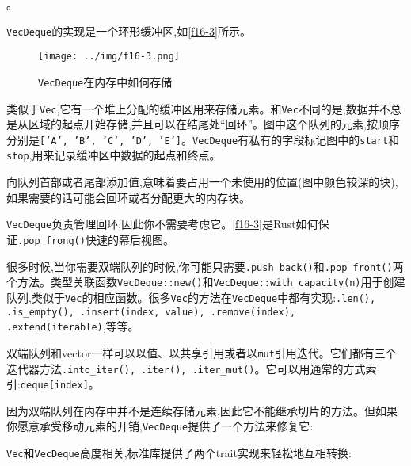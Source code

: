 。

\texttt{VecDeque}的实现是一个环形缓冲区,如\autoref{f16-3}所示。

\begin{figure}[htbp]
    \centering
    \texttt{[image: ../img/f16-3.png]}
    \caption{\texttt{VecDeque}在内存中如何存储}
    \label{f16-3}
\end{figure}

类似于\texttt{Vec},它有一个堆上分配的缓冲区用来存储元素。和\texttt{Vec}不同的是,数据并不总是从区域的起点开始存储,并且可以在结尾处“回环”。图中这个队列的元素,按顺序分别是\texttt{['A', 'B', 'C', 'D', 'E']}。\texttt{VecDeque}有私有的字段标记图中的\texttt{start}和\texttt{stop},用来记录缓冲区中数据的起点和终点。

向队列首部或者尾部添加值,意味着要占用一个未使用的位置(图中颜色较深的块),如果需要的话可能会回环或者分配更大的内存块。

\texttt{VecDeque}负责管理回环,因此你不需要考虑它。\autoref{f16-3}是Rust如何保证\texttt{.pop\_frong()}快速的幕后视图。

很多时候,当你需要双端队列的时候,你可能只需要\texttt{.push\_back()}和\texttt{.pop\_front()}两个方法。类型关联函数\texttt{VecDeque::new()}和\texttt{VecDeque::with\_capacity(n)}用于创建队列,类似于\texttt{Vec}的相应函数。很多\texttt{Vec}的方法在\texttt{VecDeque}中都有实现:\texttt{.len(), .is\_empty(), .insert(index, value), .remove(index), \\
.extend(iterable)},等等。

双端队列和vector一样可以以值、以共享引用或者以\texttt{mut}引用迭代。它们都有三个迭代器方法\texttt{.into\_iter(), .iter(), .iter\_mut()}。它可以用通常的方式索引:\texttt{deque[index]}。

因为双端队列在内存中并不是连续存储元素,因此它不能继承切片的方法。但如果你愿意承受移动元素的开销,\texttt{VecDeque}提供了一个方法来修复它:


\texttt{Vec}和\texttt{VecDeque}高度相关,标准库提供了两个trait实现来轻松地互相转换:



